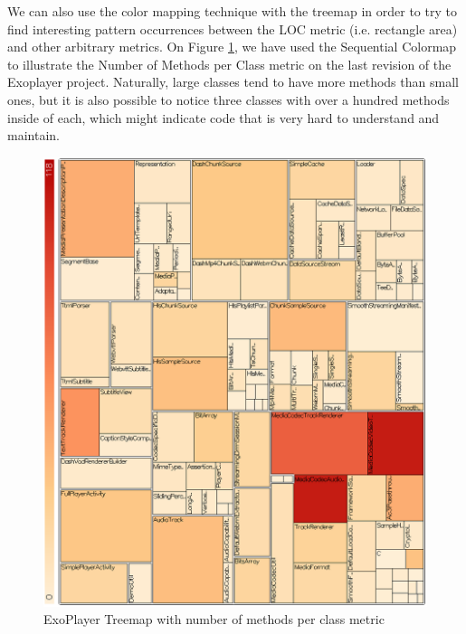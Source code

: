We can also use the color mapping technique with the treemap in order to try to find interesting pattern occurrences between the LOC metric (i.e. rectangle area) and other arbitrary metrics. On Figure \ref{fig:number_methods}, we have used the Sequential Colormap to illustrate the Number of Methods per Class metric on the last revision of the Exoplayer project. Naturally, large classes tend to have more methods than small ones, but it is also possible to notice three classes with over a hundred methods inside of each, which might indicate code that is very hard to understand and maintain.

\begin{figure}[H]
  \centering
  \includegraphics[width=\textwidth]{figures/number_methods}
  \caption{ExoPlayer Treemap with number of methods per class metric }
  \label{fig:number_methods}
\end{figure}
